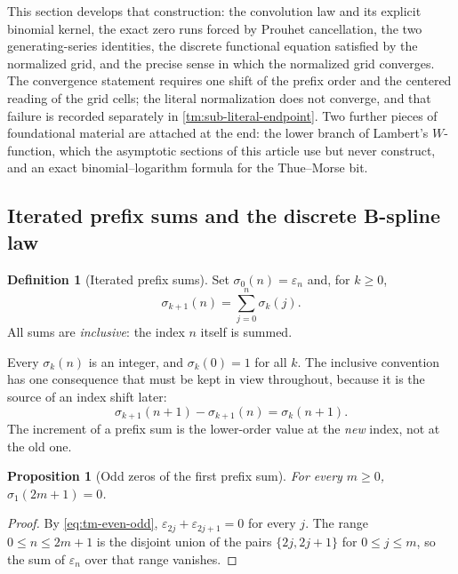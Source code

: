 \documentclass[11pt,oneside]{article}
\newtheorem{proposition}[theorem]{Proposition}
\theoremstyle{definition}
\newtheorem{definition}[theorem]{Definition}
\theoremstyle{remark}
\begin{document}
This section develops that construction: the convolution law and its explicit binomial
kernel, the exact zero runs forced by Prouhet cancellation, the two generating-series
identities, the discrete functional equation satisfied by the normalized grid, and the
precise sense in which the normalized grid converges.  The convergence statement requires
one shift of the prefix order and the centered reading of the grid cells; the literal
normalization does not converge, and that failure is recorded separately in
\cref{tm:sub-literal-endpoint}.  Two further pieces of foundational material are attached at
the end: the lower branch of Lambert's $W$-function, which the asymptotic sections of this
article use but never construct, and an exact binomial--logarithm formula for the
Thue--Morse bit.

\subsection{Iterated prefix sums and the discrete B-spline law}
\label{tm:sub-convolution}

\begin{definition}[Iterated prefix sums]
\label{thm:tm-prefix-def}
Set $\sigma_0(n)=\varepsilon_n$ and, for $k\ge0$,
\begin{equation}
 \sigma_{k+1}(n)=\sum_{j=0}^{n}\sigma_k(j).                \label{eq:tm-prefix-def}
\end{equation}
All sums are \emph{inclusive}: the index $n$ itself is summed.
\end{definition}

Every $\sigma_k(n)$ is an integer, and $\sigma_k(0)=1$ for all $k$.  The inclusive
convention has one consequence that must be kept in view throughout, because it is the
source of an index shift later:
\begin{equation}
 \sigma_{k+1}(n+1)-\sigma_{k+1}(n)=\sigma_k(n+1).          \label{eq:tm-forward-diff}
\end{equation}
The increment of a prefix sum is the lower-order value at the \emph{new} index, not at the
old one.

\begin{proposition}[Odd zeros of the first prefix sum]
\label{thm:tm-odd-zeros}
For every $m\ge0$, $\sigma_1(2m+1)=0$.
\end{proposition}

\begin{proof}
By \eqref{eq:tm-even-odd}, $\varepsilon_{2j}+\varepsilon_{2j+1}=0$ for every $j$.  The
range $0\le n\le 2m+1$ is the disjoint union of the pairs $\{2j,2j+1\}$ for $0\le j\le m$,
so the sum of $\varepsilon_n$ over that range vanishes.
\end{proof}
\end{document}
